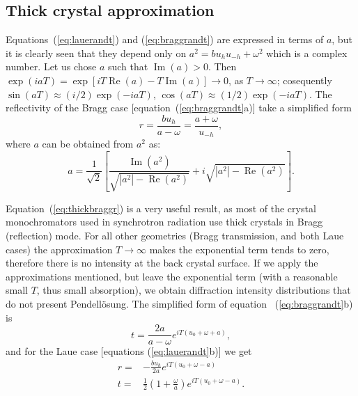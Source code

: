 \documentclass[preprint]{iucr}              %
\newcommand{\inblue}[1]{{\color{blue}#1}}
\begin{document}
\inblue{
\subsection{Thick crystal approximation}\label{sec:thick}
}

\inblue{
Equations~(\ref{eq:lauerandt}) and (\ref{eq:braggrandt}) are expressed in terms of $a$, but it is clearly seen that they depend only on $a^2=bu_h u_{-h}+\omega^2$ which is a complex number. Let us chose $a$ such that $\operatorname{Im}(a)>0$. Then  
$\exp(iaT)=\exp[iT\operatorname{Re}(a)-T\operatorname{Im}(a)]\rightarrow 0$, as $T\rightarrow \infty$; cosequently $\sin(aT)\approx (i/2) \exp(-i a T)$, $\cos(aT)\approx (1/2) \exp(-i a T)$. The reflectivity of the Bragg case [equation~(\ref{eq:braggrandt}a)] take a simplified form
\begin{equation}\label{eq:thickbraggr}
    r = \frac{b u_h}{a-\omega} = \frac{a+\omega}{u_{-h}},
\end{equation}
where $a$ can be obtained from $a^2$ as: 
\begin{equation}
a = \frac{1}{\sqrt{2}} \left[ \frac{\operatorname{Im}(a^2)}{\sqrt{|a^2|-\operatorname{Re}(a^2)}} + i \sqrt{|a^2|-\operatorname{Re}(a^2)} \right].
\end{equation}

Equation~(\ref{eq:thickbraggr}) is a very useful result, as most of the crystal monochromators used in synchrotron radiation use thick crystals in Bragg (reflection) mode. For all other geometries (Bragg transmission, and both Laue cases) the approximation $T\rightarrow \infty$ makes the exponential term tends to zero, therefore there is no intensity at the back crystal surface. If we apply the approximations mentioned, but leave the exponential term (with a reasonable small $T$, thus small absorption), we obtain diffraction intensity distributions that do not present Pendell\"osung. The simplified form of equation~ (\ref{eq:braggrandt}b) is   
\begin{equation}\label{eq:thickbraggt}
    t = \frac{2a}{a-\omega} e^{i T (u_0+\omega+a)},
\end{equation}
and for the Laue case [equations (\ref{eq:lauerandt}b)] we get
\begin{subequations}
\label{eq:thicklaue}
\begin{align}
r = & - \frac{b u_h}{2 a} e^{iT (u_0+\omega-a)}  \\
t = & \frac{1}{2} (1 + \frac{\omega}{a})e^{i T (u_0+\omega-a)}.
\end{align}
\end{subequations}
}
\end{document}
